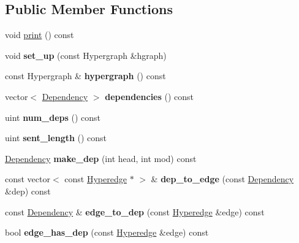 \subsection*{Public Member Functions}
\begin{DoxyCompactItemize}
\item 
void \hyperlink{classDepParser_a9aebbbde821bad423b6c01cc12f02a2c}{print} () const 
\item 
\hypertarget{classDepParser_a6131e95a8ec7b07f7a4d68dae224d52f}{
void {\bfseries set\_\-up} (const Hypergraph \&hgraph)}
\label{classDepParser_a6131e95a8ec7b07f7a4d68dae224d52f}

\item 
\hypertarget{classDepParser_aaec31758432c2d3336d2164996571688}{
const Hypergraph \& {\bfseries hypergraph} () const }
\label{classDepParser_aaec31758432c2d3336d2164996571688}

\item 
\hypertarget{classDepParser_aa64f67830bf4c3bf9936ba6056dfdff0}{
vector$<$ \hyperlink{structDependency}{Dependency} $>$ {\bfseries dependencies} () const }
\label{classDepParser_aa64f67830bf4c3bf9936ba6056dfdff0}

\item 
\hypertarget{classDepParser_aaff55cf38fd9b1fbfb22090ddeb72ba8}{
uint {\bfseries num\_\-deps} () const }
\label{classDepParser_aaff55cf38fd9b1fbfb22090ddeb72ba8}

\item 
\hypertarget{classDepParser_a86b99d09d76b7d6f8733b208e9f32822}{
uint {\bfseries sent\_\-length} () const }
\label{classDepParser_a86b99d09d76b7d6f8733b208e9f32822}

\item 
\hypertarget{classDepParser_a49afcb1a83a3c924869faf34cd9e968e}{
\hyperlink{structDependency}{Dependency} {\bfseries make\_\-dep} (int head, int mod) const }
\label{classDepParser_a49afcb1a83a3c924869faf34cd9e968e}

\item 
\hypertarget{classDepParser_a9fa2f0bf24cd870404f0a99b5926c558}{
const vector$<$ const \hyperlink{classScarab_1_1HG_1_1Hyperedge}{Hyperedge} $\ast$ $>$ \& {\bfseries dep\_\-to\_\-edge} (const \hyperlink{structDependency}{Dependency} \&dep) const }
\label{classDepParser_a9fa2f0bf24cd870404f0a99b5926c558}

\item 
\hypertarget{classDepParser_aa5ff87f99326c60633fb8e26d1737776}{
const \hyperlink{structDependency}{Dependency} \& {\bfseries edge\_\-to\_\-dep} (const \hyperlink{classScarab_1_1HG_1_1Hyperedge}{Hyperedge} \&edge) const }
\label{classDepParser_aa5ff87f99326c60633fb8e26d1737776}

\item 
\hypertarget{classDepParser_abd0b9171e59c1c40cdb58807a46a5449}{
bool {\bfseries edge\_\-has\_\-dep} (const \hyperlink{classScarab_1_1HG_1_1Hyperedge}{Hyperedge} \&edge) const }
\label{classDepParser_abd0b9171e59c1c40cdb58807a46a5449}

\end{DoxyCompactItemize}
